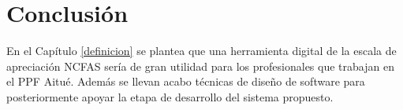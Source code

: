 \newpage
\clearpage

\section{Conclusión}

En el Capítulo \ref{definicion} se plantea que una herramienta digital de la escala de apreciación NCFAS sería de gran utilidad para los profesionales que trabajan en el PPF Aitué. Además se llevan acabo técnicas de diseño de software para posteriormente apoyar la etapa de desarrollo del sistema propuesto. 

